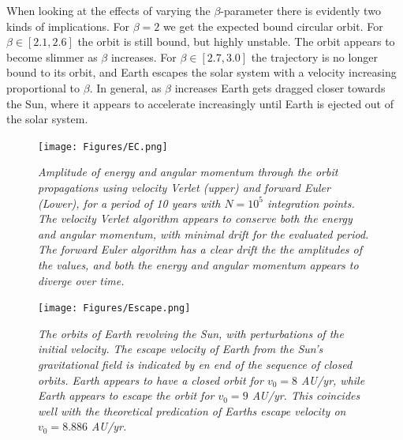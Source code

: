 \documentclass[%
reprint,nofootinbib,
amsmath,amssymb,
aps,
]{revtex4-1}
\begin{document}
\indent  When looking at the effects of varying the $\beta$-parameter there is evidently two kinds of implications. For $\beta = 2$ we get the expected bound circular orbit. For $\beta\in[2.1, 2.6]$ the orbit is still bound, but highly unstable. The orbit appears to become slimmer as $\beta$ increases. For $\beta\in[2.7, 3.0]$ the trajectory is no longer bound to its orbit, and Earth escapes the solar system with a velocity increasing proportional to $\beta$. In general, as $\beta$ increases Earth gets dragged closer towards the Sun, where it appears to accelerate increasingly until Earth is ejected out of the solar system.\\ \indent 
\begin{figure}[H]
	\texttt{[image: Figures/EC.png]}
	\vspace{3mm}
	\caption{\label{energy} \textit{Amplitude of energy and angular momentum through the orbit propagations using velocity Verlet (upper) and forward Euler (Lower), for a period of 10 years with $N = 10^5$ integration points. The velocity Verlet algorithm appears to conserve both the energy and angular momentum, with minimal drift for the evaluated period. The forward Euler algorithm has a clear drift the the amplitudes of the values, and both the energy and angular momentum appears to diverge over time. }}
\end{figure}
\vspace{0.1cm}
\begin{figure}[H]
	\texttt{[image: Figures/Escape.png]}
	\caption{\label{escape} \textit{The orbits of Earth revolving the Sun, with perturbations of the initial velocity. The escape velocity of Earth from the Sun's gravitational field is indicated by en end of the sequence of closed orbits. Earth appears to have a closed orbit for $v_0=8$ AU/yr, while Earth appears to escape the orbit for $v_0 = 9$ AU/yr. This coincides well with the theoretical predication of Earths escape velocity on $v_0 = 8.886$ AU/yr.}}
\end{figure}

\onecolumngrid

\newpage
\end{document}

